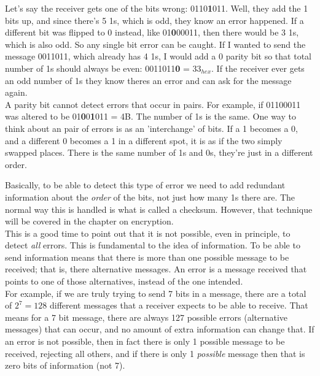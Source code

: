 Let's say the receiver gets one of the bits wrong: 0110\textbf{1}011. Well, they add the 1 bits up, and since there's 5 1s, which is odd, they know an error happened. If a different bit was flipped to 0 instead, like 01\textbf{0}00011, then there would be 3 1s, which is also odd. So any single bit error can be caught. If I wanted to send the message 0011011, which already has 4 1s, I would add a 0 parity bit so that total number of 1s should always be even: 0011011\textbf{0} = 33\(_{hex}\). If the receiver ever gets an odd number of 1s they know theres an error and can ask for the message again.\\

A parity bit cannot detect errors that occur in pairs. For example, if 01100011 was altered to be 01\textbf{0}0\textbf{1}011 = 4B. The number of 1s is the same. One way to think about an pair of errors is as an 'interchange' of bits. If a 1 becomes a 0, and a different 0 becomes a 1 in a different spot, it is as if the two simply swapped places. There is the same number of 1s and 0s, they're just in a different order.\\

\begin{center}\end{center}

Basically, to be able to detect this type of error we need to add redundant information about the \textit{order} of the bits, not just how many 1s there are. The normal way this is handled is what is called a checksum. However, that technique will be covered in the chapter on encryption.\\

This is a good time to point out that it is not possible, even in principle, to detect \textit{all} errors. This is fundamental to the idea of information. To be able to send information means that there is more than one possible message to be received; that is, there alternative messages. An error is a message received that points to one of those alternatives, instead of the one intended.\\

For example, if we are truly trying to send 7 bits in a message, there are a total of \(2^7 = 128\) different messages that a receiver expects to be able to receive. That means for a 7 bit message, there are always 127 possible errors (alternative messages) that can occur, and no amount of extra information can change that. If an error is not possible, then in fact there is only 1 possible message to be received, rejecting all others, and if there is only 1 \textit{possible} message then that is zero bits of information (not 7).\\

